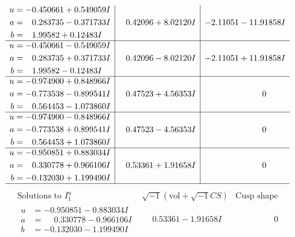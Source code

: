 \documentclass[1p]{elsarticle_modified}
\theoremstyle{definition}
\newcommand{\I}{\sqrt{-1}}
\begin{document}
$$\begin{array}{c|c|c}
\begin{aligned}
u &= -0.450661 + 0.549059 I \\
a &= \phantom{-}0.283735 - 0.371733 I \\
b &= \phantom{-}1.99582 + 0.12483 I\end{aligned}
 & \phantom{-}0.42096 + 8.02120 I & -2.11051 - 11.91858 I \\ \hline\begin{aligned}
u &= -0.450661 - 0.549059 I \\
a &= \phantom{-}0.283735 + 0.371733 I \\
b &= \phantom{-}1.99582 - 0.12483 I\end{aligned}
 & \phantom{-}0.42096 - 8.02120 I & -2.11051 + 11.91858 I \\ \hline\begin{aligned}
u &= -0.974900 + 0.848966 I \\
a &= -0.773538 - 0.899541 I \\
b &= \phantom{-}0.564453 - 1.073860 I\end{aligned}
 & \phantom{-}0.47523 + 4.56353 I & \phantom{-0.000000 } 0 \\ \hline\begin{aligned}
u &= -0.974900 - 0.848966 I \\
a &= -0.773538 + 0.899541 I \\
b &= \phantom{-}0.564453 + 1.073860 I\end{aligned}
 & \phantom{-}0.47523 - 4.56353 I & \phantom{-0.000000 } 0 \\ \hline\begin{aligned}
u &= -0.950851 + 0.883034 I \\
a &= \phantom{-}0.330778 + 0.966106 I \\
b &= -0.132030 + 1.199490 I\end{aligned}
 & \phantom{-}0.53361 + 1.91658 I & \phantom{-0.000000 } 0\\
 \hline 
 \end{array}$$\newpage$$\begin{array}{c|c|c}  
\text{Solutions to }I^u_{1}& \I (\text{vol} + \sqrt{-1}CS) & \text{Cusp shape}\\
 \hline 
\begin{aligned}
u &= -0.950851 - 0.883034 I \\
a &= \phantom{-}0.330778 - 0.966106 I \\
b &= -0.132030 - 1.199490 I\end{aligned}
 & \phantom{-}0.53361 - 1.91658 I & \phantom{-0.000000 } 0 \\ \hline\begin{aligned}

\end{aligned}
\end{array}$$
\end{document}
